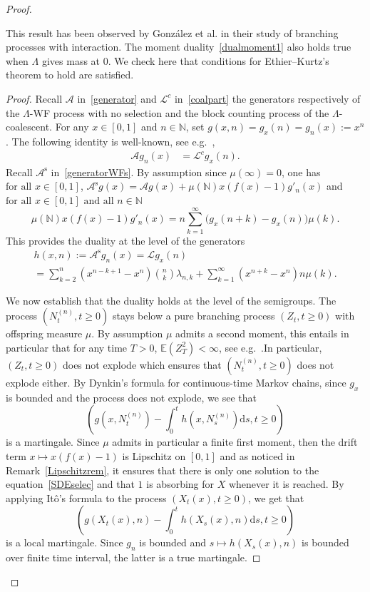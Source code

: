 \documentclass[AHL,Unicode,longabstracts,published]{cedram}
\newcommand{\ddr}{\mathrm{d}}
\newcommand{\rms}{\mathrm{s}}
\newcommand{\bbN}{\mathbb{N}}
\newcommand{\bbE}{\mathbb{E}}
\newcommand{\clA}{\mathcal{A}}
\newcommand{\clL}{\mathcal{L}}
\begin{document}
\begin{proof}
\begin{rema}\label{remKing}
This result has been observed by González et al. \cite[Lemma~2]{Gonzalesetal} in their study of branching processes with interaction. The moment duality~\eqref{dualmoment1} also holds true when $\Lambda$ gives mass at $0$. We check here that conditions for Ethier--Kurtz's theorem to hold are satisfied.
\end{rema}

\begin{proof}
Recall $\clA$ in~\eqref{generator} and $\clL^{c}$ in~\eqref{coalpart} the generators respectively of the $\Lambda$-WF process with no selection and the block counting process of the $\Lambda$-coalescent. For any $x\in [0,1]$ and $n\in \bbN$, set $g(x,n)= g_x(n)=g_n(x):=x^{n}$. The following identity is well-known, see e.g.~\cite[Lemma~2]{Gonzalesetal},
\begin{align}
\clA g_n(x)&=\clL^{c}g_x(n).
\end{align}
Recall $\clA^{\rms}$ in~\eqref{generatorWFs}. By assumption since $\mu(\infty)=0$, one has $\text{for all } x\in [0,1]$, $\clA^{\rms}g(x)=\clA g(x)+\mu(\bbN)x(f(x)-1)g'_n(x)$ and $\text{for all } x\in [0,1] \text{ and all } n\in \bbN$
\[
\mu(\bbN)x(f(x)-1)g'_n(x)=n\sum_{k=1}^{\infty}\big(g_x(n+k)-g_x(n)\big)\mu(k).
\]
This provides the duality at the level of the generators
\begin{multline}\label{expressionh}
h(x,n):=\clA^{\rms}g_n(x)=\clL g_x(n)\\
= \sum_{k=2}^{n}\left(x^{n-k+1}-x^{n}\right)\binom{n}{k}\lambda_{n,k}+\sum_{k=1}^{\infty}\left(x^{n+k}-x^{n}\right)n\mu(k).
\end{multline}

We now establish that the duality holds at the level of the semigroups. The process $(N_t^{(n)},t\geq 0)$ stays below a pure branching process $(Z_t,t\geq 0)$ with offspring measure $\mu$. By assumption $\mu$ admits a second moment, this entails in particular that for any time $T>0$, $\bbE(Z_T^{2})<\infty$, see e.g.~\cite[Chapter~3, Corollary~1 p.~111]{MR2047480}.\linebreak In particular, $(Z_t,t\geq 0)$ does not explode which ensures that $(N^{(n)}_t,t\geq 0)$ does not explode either. By Dynkin's formula for continuous-time Markov chains, since $g_x$ is bounded and the process does not explode, we see that
\[
\left(g\left(x,N_{t}^{(n)}\right)-\int_{0}^{t}h\left(x,N_s^{(n)}\right)\ddr s, t\geq 0\right)
\]
is a martingale. Since $\mu$ admits in particular a finite first moment, then the drift term $x\mapsto x(f(x)-1)$ is Lipschitz on $[0,1]$ and as noticed in Remark~\ref{Lipschitzrem}, it ensures that there is only one solution to the equation~\eqref{SDEselec} and that $1$ is absorbing for $X$ whenever it is reached. By applying Itô's formula to the process $(X_t(x),t\geq 0)$, we get that
\[
\left(g(X_{t}(x),n)-\int_{0}^{t}h(X_s(x),n)\ddr s, t\geq 0\right)
\]
is a local martingale. Since $g_n$ is bounded and $s\mapsto h(X_s(x),n)$ is bounded over finite time interval, the latter is a true martingale.


\end{proof}
\end{proof}
\end{document}
